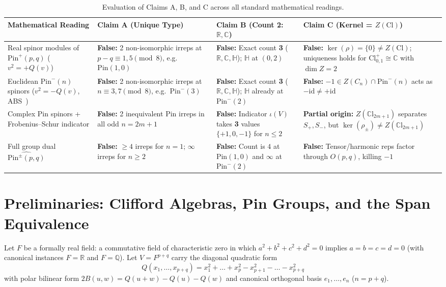 \documentclass[11pt,a4paper]{article}
\theoremstyle{plain}
\theoremstyle{definition}
\newcommand{\Cl}{\mathrm{Cl}}
\newcommand{\CCl}{\mathbb{C}\mathrm{l}}
\newcommand{\Pin}{\mathrm{Pin}}
\newcommand{\R}{\mathbb{R}}
\newcommand{\C}{\mathbb{C}}
\newcommand{\HH}{\mathbb{H}}
\newcommand{\Q}{\mathbb{Q}}
\begin{document}
\begin{table}[ht]
\centering
\footnotesize
\setlength{\tabcolsep}{4.5pt}
\begin{tabular}{>{\raggedright\arraybackslash}p{3.6cm}>{\raggedright\arraybackslash}p{3.4cm}>{\raggedright\arraybackslash}p{3.5cm}>{\raggedright\arraybackslash}p{3.8cm}}
\hline
\textbf{Mathematical Reading} & \textbf{Claim A (Unique Type)} & \textbf{Claim B (Count 2: $\R, \C$)} & \textbf{Claim C (Kernel = $Z(\Cl)$)} \\
\hline
Real spinor modules of $\Pin^+(p,q)$ ($v^2 = +Q(v)$) &
\textbf{False:} 2 non-isomorphic irreps at $p-q \equiv 1,5 \pmod 8$, e.g.\ $\Pin(1,0)$ &
\textbf{False:} Exact count \textbf{3} ($\R, \C, \HH$); $\HH$ at $(0,2)$ &
\textbf{False:} $\ker(\rho) = \{0\} \neq Z(\Cl)$; uniqueness holds for $\Cl_{0,1}^+ \cong \C$ with $\dim Z = 2$ \\
\hline
Euclidean $\Pin^-(n)$ spinors ($v^2 = -Q(v)$, ABS~\cite{ABS64}) &
\textbf{False:} 2 non-isomorphic irreps at $n \equiv 3,7 \pmod 8$, e.g.\ $\Pin^-(3)$ &
\textbf{False:} Exact count \textbf{3} ($\R, \C, \HH$); $\HH$ already at $\Pin^-(2)$ &
\textbf{False:} $-1 \in Z(C_n) \cap \Pin^-(n)$ acts as $-\mathrm{id} \neq +\mathrm{id}$ \\
\hline
Complex $\Pin$ spinors + Frobenius--Schur indicator &
\textbf{False:} 2 inequivalent $\Pin$ irreps in all odd $n = 2m+1$ &
\textbf{False:} Indicator $\iota(V)$ takes \textbf{3} values $\{+1, 0, -1\}$ for $n \le 2$ &
\textbf{Partial origin:} $Z(\CCl_{2m+1})$ separates $S_+, S_-$, but $\ker(\rho_\pm) \neq Z(\CCl_{2m+1})$ \\
\hline
Full group dual $\widehat{\Pin^\pm(p,q)}$ &
\textbf{False:} $\ge 4$ irreps for $n=1$; $\infty$ irreps for $n \ge 2$ &
\textbf{False:} Count is $4$ at $\Pin(1,0)$ and $\infty$ at $\Pin^-(2)$ &
\textbf{False:} Tensor/harmonic reps factor through $O(p,q)$, killing $-1$ \\
\hline
\end{tabular}
\caption{Evaluation of Claims A, B, and C across all standard mathematical readings.}
\label{tab:readings}
\end{table}

\section{Preliminaries: Clifford Algebras, Pin Groups, and the Span Equivalence}

Let $F$ be a formally real field: a commutative field of characteristic zero in which $a^2 + b^2 + c^2 + d^2 = 0$ implies $a = b = c = d = 0$ (with canonical instances $F = \R$ and $F = \Q$). Let $V = F^{p+q}$ carry the diagonal quadratic form
\[
  Q(x_1,\dots,x_{p+q}) = x_1^2 + \dots + x_p^2 - x_{p+1}^2 - \dots - x_{p+q}^2
\]
with polar bilinear form $2 B(u,w) = Q(u+w) - Q(u) - Q(w)$ and canonical orthogonal basis $e_1,\dots,e_n$ ($n = p+q$).
\end{document}
